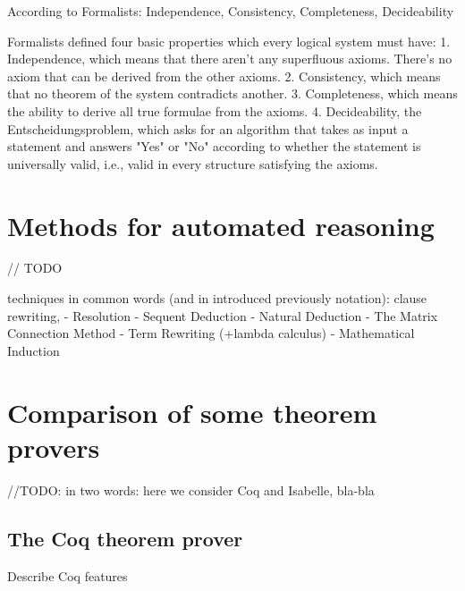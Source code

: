 \documentclass[article]{aaltoseries}
\begin{document}
According to Formalists: Independence, Consistency, Completeness, Decideability

Formalists defined four basic properties which every logical system must have:
1. Independence, which means that there aren’t any superfluous axioms. There’s no axiom that can be derived from the other axioms.
2. Consistency, which means that no theorem of the system contradicts another.
3. Completeness, which means the ability to derive all true formulae from the axioms.
4. Decideability, the Entscheidungsproblem, which asks for an algorithm that takes as input a statement and answers "Yes" or "No" according to whether the statement is universally valid, i.e., valid in every structure satisfying the axioms.


\section{Methods for automated reasoning}
\label{sec:auto_reasoning}
// TODO


techniques in common words (and in introduced previously notation): clause rewriting, 
- Resolution
- Sequent Deduction
- Natural Deduction
- The Matrix Connection Method
- Term Rewriting (+lambda calculus)
- Mathematical Induction




\section{Comparison of some theorem provers}
\label{sec:comparison}

//TODO: in two words: here we consider Coq and Isabelle, bla-bla


\subsection{The Coq theorem prover}
\label{sec:prover_coq}

Describe Coq features

\end{document}
